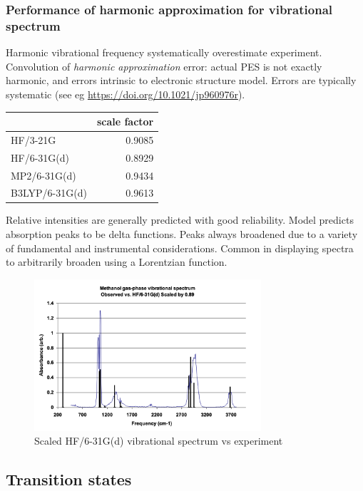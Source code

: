 \documentclass[11pt]{article}
\begin{document}
\subsubsection{Performance of harmonic approximation for vibrational spectrum}
\label{sec:org95978d2}
Harmonic vibrational frequency systematically overestimate experiment. Convolution of \emph{harmonic approximation} error: actual PES is not exactly harmonic, and errors intrinsic to electronic structure model.  Errors are typically systematic (see eg \url{https://doi.org/10.1021/jp960976r}).

\begin{center}
\begin{tabular}{lr}
 & scale factor\\
\hline
HF/3-21G & 0.9085\\
HF/6-31G(d) & 0.8929\\
MP2/6-31G(d) & 0.9434\\
B3LYP/6-31G(d) & 0.9613\\
\end{tabular}
\end{center}

Relative intensities are generally predicted with good reliability.  Model predicts absorption peaks to be delta functions.  Peaks always broadened due to a variety of fundamental and instrumental considerations.  Common in displaying spectra to arbitrarily broaden using a Lorentzian function.

\begin{figure}[htbp]
\centering
\includegraphics[width=0.75\textwidth]{./Images/Methanol.png}
\caption{Scaled HF/6-31G(d) vibrational spectrum vs experiment}
\end{figure}
\subsection{Transition states}
\label{sec:orgde87e5d}
\end{document}
